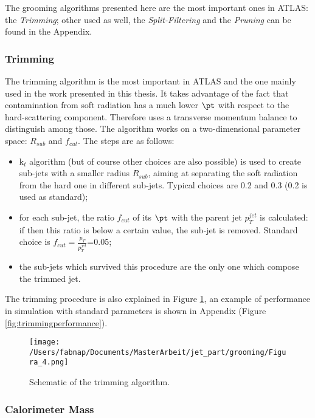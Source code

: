 The grooming algorithms presented here are the most important ones in ATLAS: the \textit{Trimming}; other used as well, the \textit{Split-Filtering} and the \textit{Pruning} can be found in the Appendix.

\subsubsection{Trimming}

The trimming algorithm is the most important in ATLAS and the one mainly used in the work presented in this thesis. It takes advantage of the fact that contamination from soft radiation has a much lower $\pt$ with respect to the hard-scattering component. Therefore uses a transverse momentum balance to distinguish among those. The algorithm works on a two-dimensional parameter space: $R_{sub}$ and $f_{cut}$.
The steps are as follows:
\begin{itemize}
 \item k$_t$ algorithm (but of course other choices are also possible) is used to create sub-jets with a smaller radius $R_{sub}$, aiming at separating the soft radiation from the hard one in different sub-jets. Typical choices are 0.2 and 0.3 (0.2 is used as standard);
 \item for each sub-jet, the ratio $f_{cut}$ of its $\pt$ with the parent jet $p_T^{jet}$ is calculated: if then this ratio is below a certain value, the sub-jet is removed. Standard choice is $f_{cut}=\frac{p_{T}}{p_{T}^{jet}}$=0.05;
 \item the sub-jets which survived this procedure are the only one which compose the trimmed jet.
\end{itemize}

The trimming procedure is also explained in Figure \ref{fig:trimming}, an example of performance in simulation with standard parameters is shown in Appendix (Figure \ref{fig:trimmingperformance}).

\begin{figure}[!ht]
  \centering
      \texttt{[image: /Users/fabnap/Documents/MasterArbeit/jet\_part/grooming/Figura\_4.png]}
  \caption{Schematic of the trimming algorithm.}
  \label{fig:trimming}
\end{figure}


\subsubsection{Calorimeter Mass}

